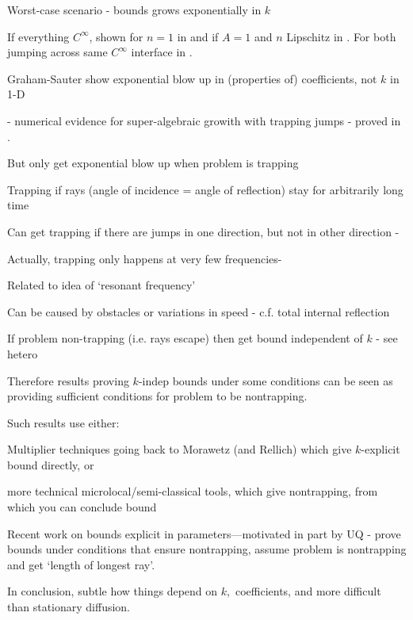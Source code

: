 \item Worst-case scenario - bounds grows exponentially in $k$
\bit
\item If everything $C^\infty$, shown for $n=1$ in \cite{Bu:02} and if $A=1$ and $n$ Lipschitz in \cite{Sh:18}. For both jumping across same $C^\infty$ interface in \cite{Bu:98}.
\item Graham-Sauter \cite{GrSa:18} show exponential blow up in (properties of) coefficients, not $k$ in 1-D
\item \cite{MoSp:19} - numerical evidence for super-algebraic growith with trapping jumps - proved in \cite{PoVo:99a,PoVo:99b,CaPoVo:99}.
\eit
\item But only get exponential blow up when problem is trapping
\item Trapping if rays (angle of incidence = angle of reflection) stay for arbitrarily long time
\item Can get trapping if there are jumps in one direction, but not in other direction - \cite{MoSp:19}
\item Actually, trapping only happens at very few frequencies-\cite{MoSp:19,LaSpWu:19}
\item Related to idea of `resonant frequency'
\item Can be caused by obstacles or variations in speed - c.f. total internal reflection
\item If problem non-trapping (i.e. rays escape) then get bound independent of $k$ - see hetero
\item Therefore results proving $k$-indep bounds under some conditions can be seen as providing sufficient conditions for problem to be nontrapping.
\item Such results use either:
\bit
\item Multiplier techniques going back to Morawetz (and Rellich)  which give $k$-explicit bound directly, or
\item more technical microlocal/semi-classical tools, which give nontrapping, from which you can conclude bound
\item Recent work on bounds explicit in parameters---motivated in part by UQ - \cite{FeLiLo:15,GrPeSp:19,PeSp:18} prove bounds under conditions that ensure nontrapping, \cite{GaSpWu:18} assume problem is nontrapping and get `length of longest ray'.
\eit
\item In conclusion, subtle how things depend on $k,$ coefficients, and more difficult than stationary diffusion.
\eit

